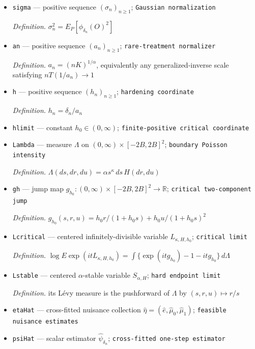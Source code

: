 \documentclass{article}
\begin{document}
\begin{itemize}
  \item \texttt{sigma} --- positive sequence \((\sigma_n)_{n\geq1}\); \texttt{Gaussian normalization}
  \par\smallskip\noindent\emph{Definition.} \(\sigma_n^2=E_P[\phi_{\delta_n}(O)^2]\)
  \item \texttt{an} --- positive sequence \((a_n)_{n\geq1}\); \texttt{rare-\allowbreak{}treatment normalizer}
  \par\smallskip\noindent\emph{Definition.} \(a_n=(nK)^{1/\alpha}\), equivalently any generalized-inverse scale satisfying \(nT(1/a_n)\to1\)
  \item \texttt{h} --- positive sequence \((h_n)_{n\geq1}\); \texttt{hardening coordinate}
  \par\smallskip\noindent\emph{Definition.} \(h_n=\delta_n/a_n\)
  \item \texttt{hlimit} --- constant \(h_0\in(0,\infty)\); \texttt{finite-\allowbreak{}positive critical coordinate}
  \item \texttt{Lambda} --- measure \(\Lambda\) on \((0,\infty)\times[-2B,2B]^2\); \texttt{boundary Poisson intensity}
  \par\smallskip\noindent\emph{Definition.} \(\Lambda(ds,dr,du)=\alpha s^{\kappa}\,ds\,H(dr,du)\)
  \item \texttt{gh} --- jump map \(g_{h_0}:(0,\infty)\times[-2B,2B]^2\to\mathbb R\); \texttt{critical two-\allowbreak{}component jump}
  \par\smallskip\noindent\emph{Definition.} \(g_{h_0}(s,r,u)=h_0r/(1+h_0s)+h_0u/(1+h_0s)^2\)
  \item \texttt{Lcritical} --- centered infinitely-divisible variable \(L_{\kappa,H,h_0}\); \texttt{critical limit}
  \par\smallskip\noindent\emph{Definition.} \(\log E\exp(itL_{\kappa,H,h_0})=\int\{\exp(itg_{h_0})-1-itg_{h_0}\}\,d\Lambda\)
  \item \texttt{Lstable} --- centered \(\alpha\)-stable variable \(S_{\alpha,H}\); \texttt{hard endpoint limit}
  \par\smallskip\noindent\emph{Definition.} its Lévy measure is the pushforward of \(\Lambda\) by \((s,r,u)\mapsto r/s\)
  \item \texttt{etaHat} --- cross-fitted nuisance collection \(\widehat\eta=(\widehat e,\widehat\mu_0,\widehat\mu_1)\); \texttt{feasible nuisance estimates}
  \item \texttt{psiHat} --- scalar estimator \(\widehat\psi_{\delta_n}\); \texttt{cross-\allowbreak{}fitted one-\allowbreak{}step estimator}

\end{itemize}
\end{document}
